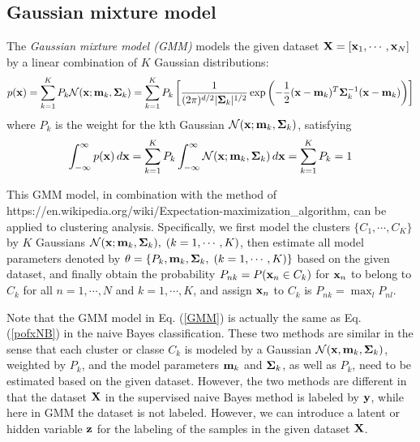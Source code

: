 \documentclass{article}
\begin{document}



\subsection{Gaussian mixture model}



The {\em Gaussian mixture model (GMM)} models the given dataset 
${\bf X}=[{\bf x}_1,\cdots,{\bf x}_N]$ by a linear combination of 
$K$ Gaussian distributions:
\begin{equation}
  p({\bf x})=\sum_{k=1}^K P_k {\cal N}({\bf x}; {\bf m}_k,{\bf\Sigma}_k)
  =\sum_{k=1}^K P_k \left[
  \frac{1}{(2\pi)^{d/2}|{\bf\Sigma}_k|^{1/2}}
  \exp\left(-\frac{1}{2}({\bf x}-{\bf m}_k)^T
  {\bf\Sigma}_k^{-1}({\bf x}-{\bf m}_k)\right)\right]
  \label{GMM}
\end{equation}
where $P_k$ is the weight for the kth Gaussian 
${\cal N}({\bf x}; {\bf m}_k,{\bf\Sigma}_k)$, satisfying
\begin{equation}
  \int_{-\infty}^\infty p({\bf x})\,d{\bf x}
  =\sum_{k=1}^K P_k \int_{-\infty}^\infty
  {\cal N}({\bf x}; {\bf m}_k,{\bf\Sigma}_k)\,d{\bf x}
  =\sum_{k=1}^K P_k =1
\end{equation}

This GMM model, in combination with the method of 
{https://en.wikipedia.org/wiki/Expectation-maximization_algorithm},
can be applied to clustering analysis. Specifically, we first 
model the clusters $\{C_1,\cdots,C_K\}$ by $K$ Gaussians
${\cal N}({\bf x}; {\bf m}_k,{\bf\Sigma}_k),\;(k=1,\cdots,K)$, 
then estimate all model parameters denoted by 
$\theta =\{P_k,{\bf m}_k,{\bf\Sigma}_k,\;(k=1,\cdots,K)\}$ 
based on the given dataset, and finally obtain the probability 
$P_{nk}=P({\bf x}_n\in C_k)$ for ${\bf x}_n$ to belong to $C_k$ 
for all $n=1,\cdots,N$ and $k=1,\cdots,K$, and assign ${\bf x}_n$ 
to $C_k$ is $P_{nk}=\max_l P_{nl}$.

Note that the GMM model in Eq. (\ref{GMM}) is actually the same 
as Eq. (\ref{pofxNB}) in the naive Bayes classification. These two
methods are similar in the sense that each cluster or classe $C_k$
is modeled by a Gaussian ${\cal N}({\bf x},{\bf m}_k,{\bf\Sigma}_k)$, 
weighted by $P_k$, and the model parameters ${\bf m}_k$ and ${\bf\Sigma}_k$,
as well as $P_k$, need to be estimated based on the given dataset. 
However, the two methods are different in that the dataset ${\bf X}$ 
in the supervised naive Bayes method is labeled by ${\bf y}$, while
here in GMM the dataset is not labeled. However, we can introduce a
latent or hidden variable ${\bf z}$ for the labeling of the samples 
in the given dataset ${\bf X}$.
\end{document}
